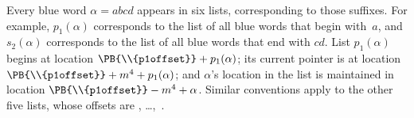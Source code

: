 Every blue word $\alpha=abcd$ appears in six lists, corresponding
to those suffixes.
For example, $p_1(\alpha)$ corresponds to the list of all blue words that begin
with~$a$, and $s_2(\alpha)$ corresponds to the list of all blue words that
end with $cd$. List $p_1(\alpha)$ begins at  location
$\PB{\\{p1offset}}+p_1(\alpha)$; its current pointer is at 
location
$\PB{\\{p1offset}}+m^4+p_1(\alpha)$; and $\alpha$'s location in the list is
maintained in  location $\PB{\\{p1offset}}-m^4+\alpha$. Similar
conventions apply to the other five lists, whose offsets are
, \dots,~.

